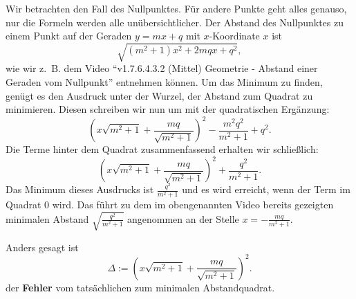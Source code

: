 \documentclass[a4paper]{amsart}
\theoremstyle{definition}
\begin{document}
Wir betrachten den Fall des Nullpunktes. Für andere Punkte geht alles genauso, nur die Formeln werden alle unübersichtlicher. Der Abstand des Nullpunktes zu einem Punkt auf der Geraden $y = mx + q$ mit $x$-Koordinate $x$ ist 
\begin{equation}
   \sqrt{(m^2+1)x^2 + 2mqx + q^2},
\end{equation}
wie wir z.~B. dem Video "`v1.7.6.4.3.2 (Mittel) Geometrie - Abstand einer Geraden vom Nullpunkt"' entnehmen können. Um das Minimum zu finden, genügt es den Ausdruck unter der Wurzel, der Abstand zum Quadrat zu minimieren.
Diesen schreiben wir nun um mit der quadratischen Ergänzung:
\begin{equation}
   \left( x \sqrt{m^2+1} + \frac{mq}{\sqrt{m^2+1}} \right)^2 - \frac{m^2q^2}{m^2+1} + q^2.
\end{equation}
Die Terme hinter dem Quadrat zusammenfassend erhalten wir schließlich:
\begin{equation}
   \boxed{
      \left( x \sqrt{m^2+1} + \frac{mq}{\sqrt{m^2+1}} \right)^2 + \frac{q^2}{m^2+1}.
   }
\end{equation}
Das Minimum dieses Ausdrucks ist $\frac{q^2}{m^2+1}$ und es wird erreicht, wenn der Term im Quadrat $0$ wird. Das führt zu dem im obengenannten Video bereits gezeigten minimalen Abstand $\sqrt{\frac{q^2}{m^2+1}}$ angenommen an der Stelle $x = -\frac{mq}{m^2+1}$.

Anders gesagt ist
\begin{equation}
   \boxed{
      \Delta := \left( x \sqrt{m^2+1} + \frac{mq}{\sqrt{m^2+1}} \right)^2 .
   }
\end{equation}
der \textbf{Fehler} vom tatsächlichen zum minimalen Abstandquadrat.
\end{document}
